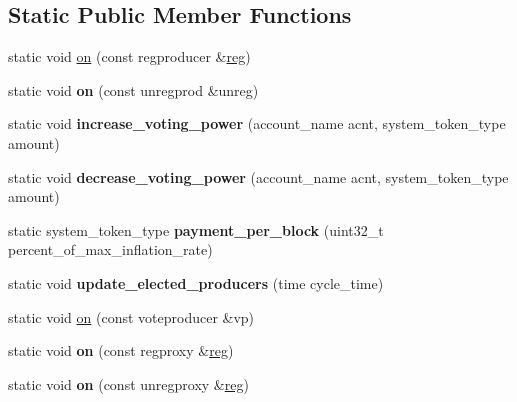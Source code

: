 \subsection*{Static Public Member Functions}
\begin{DoxyCompactItemize}
\item 
static void \mbox{\hyperlink{classaaciosystem_1_1voting_abbefdfb92fa01d247f1f5ee366d332bc}{on}} (const regproducer \&\mbox{\hyperlink{structreg}{reg}})
\item 
\mbox{\label{classaaciosystem_1_1voting_ad6b9b4b99af7cd8923c5f66dd0711d30}} 
static void {\bfseries on} (const unregprod \&unreg)
\item 
\mbox{\label{classaaciosystem_1_1voting_a9f07850cdc969f00d8288d07fa12935c}} 
static void {\bfseries increase\+\_\+voting\+\_\+power} (account\+\_\+name acnt, system\+\_\+token\+\_\+type amount)
\item 
\mbox{\label{classaaciosystem_1_1voting_a4949c64094e66bcf62042793807372e2}} 
static void {\bfseries decrease\+\_\+voting\+\_\+power} (account\+\_\+name acnt, system\+\_\+token\+\_\+type amount)
\item 
\mbox{\label{classaaciosystem_1_1voting_a07c1cf93c15b9c6880fabe41ed65cc21}} 
static system\+\_\+token\+\_\+type {\bfseries payment\+\_\+per\+\_\+block} (uint32\+\_\+t percent\+\_\+of\+\_\+max\+\_\+inflation\+\_\+rate)
\item 
\mbox{\label{classaaciosystem_1_1voting_a723e634d6e26a4cffdab1ec5c470d6bb}} 
static void {\bfseries update\+\_\+elected\+\_\+producers} (time cycle\+\_\+time)
\item 
static void \mbox{\hyperlink{classaaciosystem_1_1voting_a58de0ff458be70709e59cd781401dc42}{on}} (const voteproducer \&vp)
\item 
\mbox{\label{classaaciosystem_1_1voting_a098c998970250bfd86d7cb0afe2a6e09}} 
static void {\bfseries on} (const regproxy \&\mbox{\hyperlink{structreg}{reg}})
\item 
\mbox{\label{classaaciosystem_1_1voting_aaf65a992923c136cc1bc6abcdb22380f}} 
static void {\bfseries on} (const unregproxy \&\mbox{\hyperlink{structreg}{reg}})
\end{DoxyCompactItemize}
